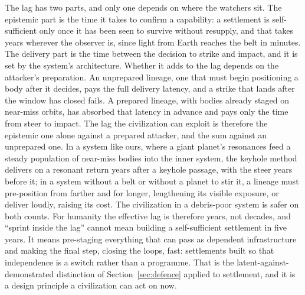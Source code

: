 \documentclass[preprint,12pt]{elsarticle}
\theoremstyle{definition}
\begin{document}
The lag has two parts, and only one depends on where the watchers sit. The epistemic part is the time it takes to confirm a capability: a settlement is self-sufficient only once it has been seen to survive without resupply, and that takes years wherever the observer is, since light from Earth reaches the belt in minutes. The delivery part is the time between the decision to strike and impact, and it is set by the system's architecture. Whether it adds to the lag depends on the attacker's preparation. An unprepared lineage, one that must begin positioning a body after it decides, pays the full delivery latency, and a strike that lands after the window has closed fails. A prepared lineage, with bodies already staged on near-miss orbits, has absorbed that latency in advance and pays only the time from steer to impact. The lag the civilization can exploit is therefore the epistemic one alone against a prepared attacker, and the sum against an unprepared one. In a system like ours, where a giant planet's resonances feed a steady population of near-miss bodies into the inner system, the keyhole method delivers on a resonant return years after a keyhole passage, with the steer years before it; in a system without a belt or without a planet to stir it, a lineage must pre-position from farther and for longer, lengthening its visible exposure, or deliver loudly, raising its cost. The civilization in a debris-poor system is safer on both counts. For humanity the effective lag is therefore years, not decades, and ``sprint inside the lag'' cannot mean building a self-sufficient settlement in five years. It means pre-staging everything that can pass as dependent infrastructure and making the final step, closing the loops, fast: settlements built so that independence is a switch rather than a programme. That is the latent-against-demonstrated distinction of Section~\ref{sec:defence} applied to settlement, and it is a design principle a civilization can act on now.
\end{document}
